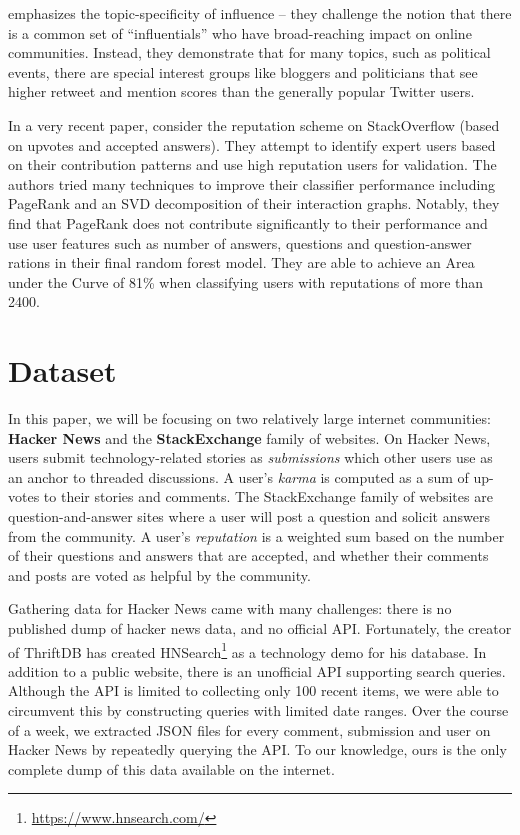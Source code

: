 \documentclass[11pt]{article}
\begin{document}
\citet{cha2010measuring} emphasizes the topic-specificity of influence -- they challenge
the notion that there is a common set of ``influentials'' who have
broad-reaching impact on online communities. Instead, they demonstrate that for
many topics, such as political events, there are special interest groups like
bloggers and politicians that see higher retweet and mention scores than the
generally popular Twitter users.

In a very recent paper, \citet{movshovitzanalysis} consider the reputation
scheme on StackOverflow (based on upvotes and accepted answers). They 
attempt to identify expert users based on their contribution
patterns and use high reputation users for validation. The authors tried many 
techniques to improve their classifier performance including PageRank and
an SVD decomposition of their interaction graphs. Notably, they find
that PageRank does not contribute significantly to their performance
and use user features such as number of answers, questions and question-answer 
rations in their final random forest model. They are
able to achieve an Area under the Curve of 81\% when classifying users
with reputations of more than 2400.

\section{Dataset}
In this paper, we will be focusing on two relatively large internet communities:
\textbf{Hacker News} and the \textbf{StackExchange} family of
websites. On Hacker News, users submit technology-related stories as
\textit{submissions} which other users use as an anchor to threaded discussions.
A user's \textit{karma} is computed as a sum of up-votes to their stories and
comments.  The StackExchange family of websites are question-and-answer sites
where a user will post a question and solicit answers from the community. A
user's \textit{reputation} is a weighted sum based on the number of their
questions and answers that are accepted, and whether their comments and posts
are voted as helpful by the community.

Gathering data for Hacker News came with many challenges: there is no published
dump of hacker news data, and no official API. Fortunately, the creator
of ThriftDB has created HNSearch\footnote{\url{https://www.hnsearch.com/}} as a technology
demo for his database. In addition to a public website, there is an unofficial API
supporting search queries. Although the API is limited to collecting 
only 100 recent items, we were able to circumvent this by constructing queries with limited
date ranges. Over the course of a week, we extracted JSON files for every comment,
submission and user on Hacker News by repeatedly querying the API\@. To our knowledge,
ours is the only complete dump of this data available on the internet.
\end{document}
